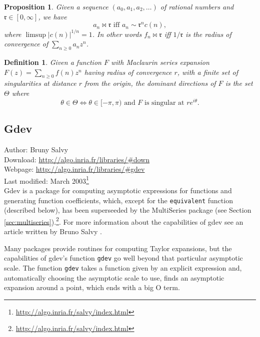 \documentclass[12pt]{article}
\theoremstyle{plain}
\newtheorem{thm}{Theorem}
\newtheorem{pro}{Proposition}
\newtheorem{defin}{Definition}
\newcommand{\codefont}[1]{{\fontshape{n}\texttt{#1}}}
\begin{document}
\begin{pro}
Given a sequence \( (a_0, a_1, a_2, \dots ) \) of rational numbers and \( \mathfrak{r} \in [0,\infty] \), we have
\[ a_n \bowtie \mathfrak{r} \text{ iff } a_n \sim \mathfrak{r}^{n}c(n), \]
where \( \limsup |c(n)|^{1/n} = 1 \).
In other words \( f_n \bowtie \mathfrak{r}\) iff \( 1/\mathfrak{r} \) is the radius of convergence of \( \sum_{n \geq 0} a_n z^n \).
\end{pro}

\begin{defin}

Given a function \( F \)
with Maclaurin series expansion \( F(z) = \sum_{n \geq 0} f(n) z^n \) having radius of convergence \( r \), with a finite set of singularities at distance \( r \) from the origin,
the \emph{dominant directions} of \( F \) is the set \( \Theta \) where
\[ \theta \in \Theta \iff \theta \in [-\pi, \pi) \text{ and } F \text{ is singular at } r e^{i \theta}. \]
\end{defin}


\subsection{Gdev}
\label{sec:gdev}

Author: Bruny Salvy
\\
Download: \url{http://algo.inria.fr/libraries/\#down}
\\
Webpage: \url{http://algo.inria.fr/libraries/\#gdev}
\\
Last modified: March 2003\footnote{
 \url{http://algo.inria.fr/salvy/index.html}
}
\\

Gdev is a package for computing asymptotic expressions for functions and generating function coefficients,
which,
except for the \codefont{equivalent} function (described below),
has been superseeded by the MultiSeries package (see Section \ref{sec:multiseries}).\footnote{
 \url{http://algo.inria.fr/salvy/index.html}
}.
For more
information about the capabilities of gdev
see an article written by Bruno Salvy \cite{gdevexamples}.

Many packages provide routines for computing Taylor expansions, but the capabilities of gdev's function \codefont{gdev} go well beyond that particular asymptotic scale.
The function \codefont{gdev}
takes a function given by an explicit expression
and,
automatically choosing the asymptotic scale to use,
finds an asymptotic expansion around a point, which ends with a big O term.
\end{document}
